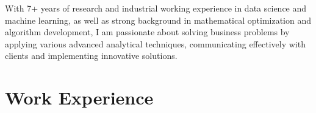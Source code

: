 \documentclass[11pt,a4paper,sans]{moderncv}        %
\begin{document}
\makecvtitle
\vspace*{-8mm}
\small{With 7+ years of research and industrial working experience in data science and machine learning, as well as strong background in mathematical optimization and algorithm development, I am passionate about solving business problems by applying various advanced analytical techniques, communicating effectively with clients and implementing innovative solutions.}

\section{Work Experience}

\vspace{4pt}
\end{document}
